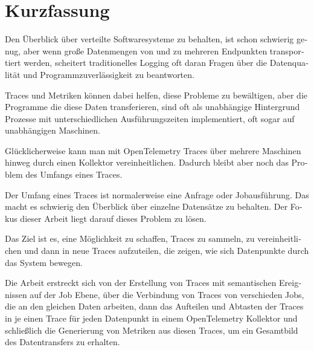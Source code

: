 \chapter{Kurzfassung}

\begin{german}
    Den Überblick über verteilte Softwaresysteme zu behalten, ist schon schwierig genug, 
    aber wenn große Datenmengen von und zu mehreren Endpunkten transportiert werden,
    scheitert traditionelles Logging oft daran Fragen über die Datenqualität
    und Programmzuverlässigkeit zu beantworten.
    
    Traces und Metriken können dabei helfen, diese Probleme zu bewältigen,
    aber die Programme die diese Daten transferieren, sind oft als
    unabhängige Hintergrund Prozesse mit unterschiedlichen Ausführungszeiten
    implementiert, oft sogar auf unabhängigen Maschinen.
    
    Glücklicherweise kann man mit OpenTelemetry Traces über mehrere Maschinen 
    hinweg durch einen Kollektor vereinheitlichen.
    Dadurch bleibt aber noch das Problem des Umfangs eines Traces.
    
    Der Umfang eines Traces ist normalerweise eine Anfrage oder Jobausführung.
    Das macht es schwierig den Überblick über einzelne Datensätze zu behalten.
    Der Fokus dieser Arbeit liegt darauf dieses Problem zu lösen.\par
    
    Das Ziel ist es, eine Möglichkeit zu schaffen, Traces zu sammeln, zu vereinheitlichen
    und dann in neue Traces aufzuteilen, die  zeigen, wie sich Datenpunkte durch das System
    bewegen. 
    
    Die Arbeit erstreckt sich von der Erstellung von Traces mit semantischen Ereignissen auf der Job Ebene,
    über die Verbindung von Traces von verschieden Jobs, die an den gleichen Daten arbeiten,
    dann das Aufteilen und Abtasten der Traces in je einen Trace für jeden Datenpunkt in einem OpenTelemetry
    Kollektor und schließlich die Generierung von Metriken aus diesen Traces, um ein Gesamtbild
    des Datentransfers zu erhalten.
\end{german}
